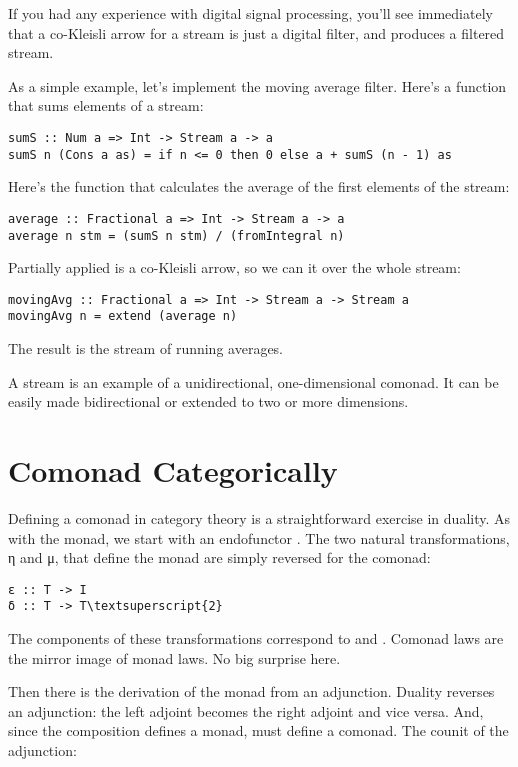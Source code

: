 If you had any experience with digital signal processing, you'll see
immediately that a co-Kleisli arrow for a stream is just a digital
filter, and  produces a filtered stream.

As a simple example, let's implement the moving average filter. Here's a
function that sums  elements of a stream:

\begin{verbatim}
sumS :: Num a => Int -> Stream a -> a
sumS n (Cons a as) = if n <= 0 then 0 else a + sumS (n - 1) as
\end{verbatim}
Here's the function that calculates the average of the first 
elements of the stream:

\begin{verbatim}
average :: Fractional a => Int -> Stream a -> a
average n stm = (sumS n stm) / (fromIntegral n)
\end{verbatim}
Partially applied  is a co-Kleisli arrow, so we can
 it over the whole stream:

\begin{verbatim}
movingAvg :: Fractional a => Int -> Stream a -> Stream a
movingAvg n = extend (average n)
\end{verbatim}
The result is the stream of running averages.

A stream is an example of a unidirectional, one-dimensional comonad. It
can be easily made bidirectional or extended to two or more dimensions.

\section{Comonad Categorically}\label{comonad-categorically}

Defining a comonad in category theory is a straightforward exercise in
duality. As with the monad, we start with an endofunctor . The
two natural transformations, η and μ, that define the monad are simply
reversed for the comonad:

\begin{Verbatim}[commandchars=\\\{\}]
ε :: T -> I
δ :: T -> T\textsuperscript{2}
\end{Verbatim}
The components of these transformations correspond to 
and . Comonad laws are the mirror image of monad laws.
No big surprise here.

Then there is the derivation of the monad from an adjunction. Duality
reverses an adjunction: the left adjoint becomes the right adjoint and
vice versa. And, since the composition  defines a monad,
 must define a comonad. The counit of the adjunction:

